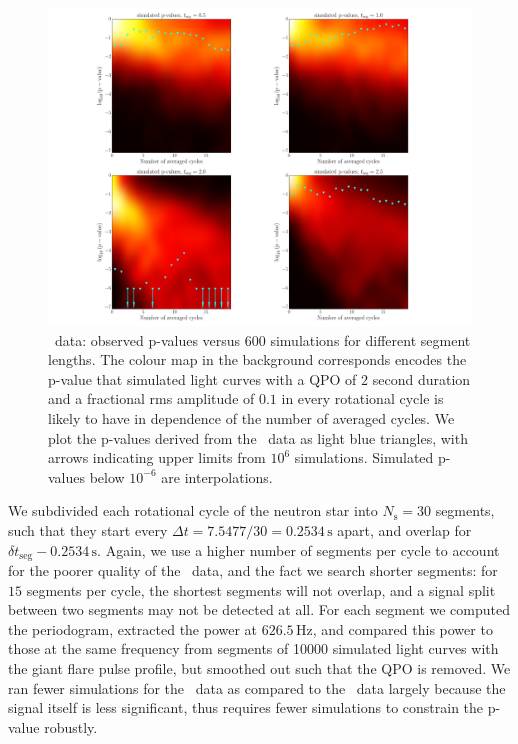 \documentclass{emulateapj}
\begin{document}
\begin{figure}[htbp]
\begin{center}
\includegraphics[width=\textwidth]{f8.pdf}
\caption{\rhessi\ data: observed p-values versus $600$ simulations for different segment lengths. The colour map in the background corresponds encodes the p-value that simulated light curves with a QPO of $2$ second duration and a fractional rms amplitude of $0.1$ in every rotational cycle is likely to have in dependence of the number of averaged cycles. We plot the p-values derived from the \rhessi\ data as light blue triangles, with arrows indicating upper limits from $10^{6}$ simulations. Simulated p-values below $10^{-6}$ are interpolations.}

\label{fig:rhessi_sims1_pvalues}
\end{center}
\end{figure}
We subdivided each rotational cycle of the neutron star into $N_\mathrm{s} = 30$ segments, such that they start every $\Delta t = 7.5477/30 = 0.2534 \, \mathrm{s}$ apart, and overlap for $\delta t_\mathrm{seg} - 0.2534 \, \mathrm{s}$. Again, we use a higher number of segments per cycle to account for the poorer quality of the \rhessi\ data, and the fact we search shorter segments: for $15$ segments per cycle, the shortest segments will not overlap, and a signal split between two segments may not be detected at all.
For each segment we computed the periodogram, extracted the power at $626.5 \, \mathrm{Hz}$, and compared this power to those at the same frequency from segments of 10000 simulated light curves with the giant flare pulse profile, but smoothed out such that the QPO is removed. We ran fewer simulations for the \rhessi\ data as compared to the \rxte\ data largely because the signal itself is less significant, thus requires fewer simulations to constrain the p-value robustly. 
\end{document}
